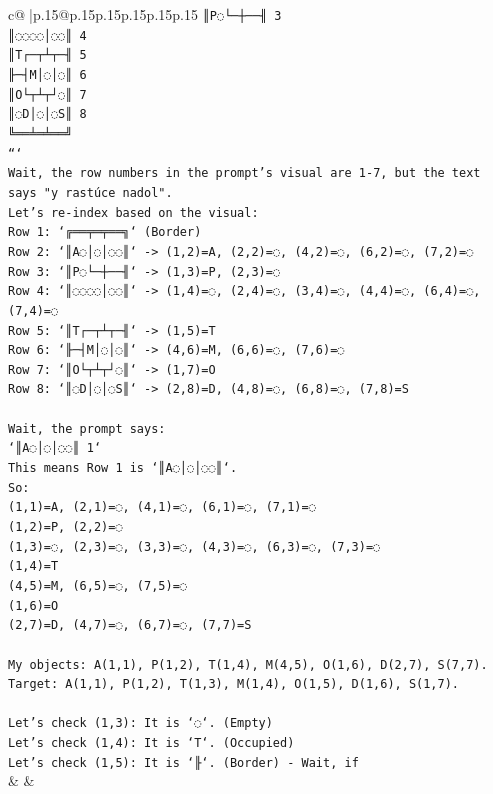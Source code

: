\documentclass{article}
\begin{document}
{\begin{supertabular}{c@{$\;$}|p{.15\linewidth}@{}p{.15\linewidth}p{.15\linewidth}p{.15\linewidth}p{.15\linewidth}p{.15\linewidth}}
{{{\texttt{║P◌└─┼──╢ 3} \\
\texttt{║◌◌◌◌│◌◌║ 4} \\
\texttt{║T┌─┬┴┬─╢ 5} \\
\texttt{╟─┤M│◌│◌║ 6} \\
\texttt{║O└┬┴┬┘◌║ 7} \\
\texttt{║◌D│◌│◌S║ 8} \\
\texttt{╚══╧═╧══╝} \\
\texttt{```} \\
\texttt{Wait, the row numbers in the prompt's visual are 1{-}7, but the text says "y rastúce nadol".} \\
\texttt{Let's re{-}index based on the visual:} \\
\texttt{Row 1: `╔══╤═╤══╗` (Border)} \\
\texttt{Row 2: `║A◌│◌│◌◌║` {-}> (1,2)=A, (2,2)=◌, (4,2)=◌, (6,2)=◌, (7,2)=◌} \\
\texttt{Row 3: `║P◌└─┼──╢` {-}> (1,3)=P, (2,3)=◌} \\
\texttt{Row 4: `║◌◌◌◌│◌◌║` {-}> (1,4)=◌, (2,4)=◌, (3,4)=◌, (4,4)=◌, (6,4)=◌, (7,4)=◌} \\
\texttt{Row 5: `║T┌─┬┴┬─╢` {-}> (1,5)=T} \\
\texttt{Row 6: `╟─┤M│◌│◌║` {-}> (4,6)=M, (6,6)=◌, (7,6)=◌} \\
\texttt{Row 7: `║O└┬┴┬┘◌║` {-}> (1,7)=O} \\
\texttt{Row 8: `║◌D│◌│◌S║` {-}> (2,8)=D, (4,8)=◌, (6,8)=◌, (7,8)=S} \\
\\ 
\texttt{Wait, the prompt says:} \\
\texttt{`║A◌│◌│◌◌║ 1`} \\
\texttt{This means Row 1 is `║A◌│◌│◌◌║`.} \\
\texttt{So:} \\
\texttt{(1,1)=A, (2,1)=◌, (4,1)=◌, (6,1)=◌, (7,1)=◌} \\
\texttt{(1,2)=P, (2,2)=◌} \\
\texttt{(1,3)=◌, (2,3)=◌, (3,3)=◌, (4,3)=◌, (6,3)=◌, (7,3)=◌} \\
\texttt{(1,4)=T} \\
\texttt{(4,5)=M, (6,5)=◌, (7,5)=◌} \\
\texttt{(1,6)=O} \\
\texttt{(2,7)=D, (4,7)=◌, (6,7)=◌, (7,7)=S} \\
\\ 
\texttt{My objects: A(1,1), P(1,2), T(1,4), M(4,5), O(1,6), D(2,7), S(7,7).} \\
\texttt{Target: A(1,1), P(1,2), T(1,3), M(1,4), O(1,5), D(1,6), S(1,7).} \\
\\ 
\texttt{Let's check (1,3): It is `◌`. (Empty)} \\
\texttt{Let's check (1,4): It is `T`. (Occupied)} \\
\texttt{Let's check (1,5): It is `╟`. (Border) {-} Wait, if} \\
            }
        }
    }
    & & \\ \\


\end{supertabular}}
\end{document}
